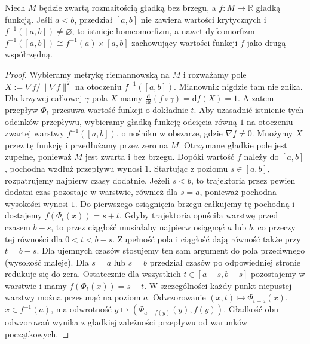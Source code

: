 \begin{stwierdzenie}
Niech $M$ będzie zwartą rozmaitością gładką bez brzegu,
a $f:M\to\mathbb R$ gładką funkcją. Jeśli
$a<b$, przedział $[a,b]$ nie zawiera wartości krytycznych i
$f^{-1}([a,b])\ne\varnothing$, to istnieje
homeomorfizm, a nawet dyfeomorfizm
$f^{-1}([a,b])\cong f^{-1}(a)\times[a,b]$
zachowujący wartości funkcji $f$ jako drugą współrzędną.
\end{stwierdzenie}

\begin{proof}
Wybieramy metrykę riemannowską na $M$ i rozważamy
pole $X:=\nabla f/\|\nabla f\|^2$ na otoczeniu
$f^{-1}([a,b])$. Mianownik nigdzie tam nie znika.
Dla krzywej całkowej $\gamma$ pola $X$ mamy
$\frac{\mathrm d}{\mathrm dt}(f\circ\gamma)
=\mathrm df(X)=1$.
A zatem przepływ $\Phi_t$ przesuwa wartość funkcji
o dokładnie $t$. Aby uzasadnić istnienie tych odcinków przepływu,
wybieramy gładką funkcję odcięcia równą $1$ na
otoczeniu zwartej warstwy $f^{-1}([a,b])$, o nośniku
w obszarze, gdzie $\nabla f\ne0$. Mnożymy $X$ przez
tę funkcję i przedłużamy przez zero na $M$.
Otrzymane gładkie pole jest zupełne, ponieważ $M$
jest zwarta i bez brzegu. Dopóki wartość $f$ należy
do $[a,b]$, pochodna wzdłuż przepływu wynosi $1$.
Startując z poziomu $s\in[a,b]$, rozpatrujemy najpierw
czasy dodatnie. Jeżeli $s<b$, to trajektoria przez
pewien dodatni czas pozostaje w warstwie, również
dla $s=a$, ponieważ pochodna wysokości wynosi $1$.
Do pierwszego osiągnięcia brzegu całkujemy tę pochodną
i dostajemy $f(\Phi_t(x))=s+t$. Gdyby trajektoria
opuściła warstwę przed czasem $b-s$, to przez
ciągłość musiałaby najpierw osiągnąć $a$ lub $b$,
co przeczy tej równości dla $0<t<b-s$.
Zupełność pola i ciągłość dają równość także przy
$t=b-s$. Dla ujemnych czasów stosujemy ten sam
argument do pola przeciwnego (wysokość maleje).
Dla $s=a$ lub $s=b$ przedział czasów po odpowiedniej
stronie redukuje się do zera. Ostatecznie dla wszystkich
$t\in[a-s,b-s]$ pozostajemy w warstwie i mamy
$f(\Phi_t(x))=s+t$. W szczególności każdy punkt
niepustej warstwy można przesunąć na poziom $a$.
Odwzorowanie $(x,t)\mapsto\Phi_{t-a}(x)$,
$x\in f^{-1}(a)$, ma odwrotność
$y\mapsto(\Phi_{a-f(y)}(y),f(y))$.
Gładkość obu odwzorowań wynika z gładkiej zależności
przepływu od warunków początkowych.
\end{proof}

